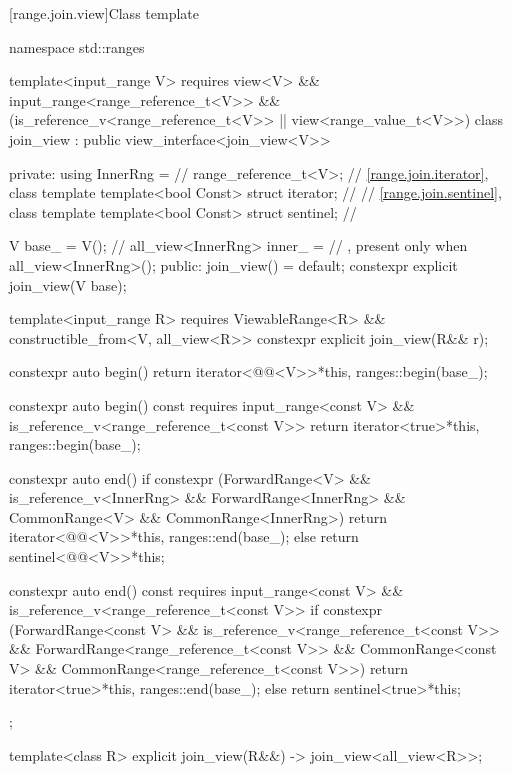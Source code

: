 [range.join.view]{Class template }

\begin{codeblock}
namespace std::ranges {
  template<input_range V>
    requires view<V> && input_range<range_reference_t<V>> &&
             (is_reference_v<range_reference_t<V>> ||
              view<range_value_t<V>>)
  class join_view : public view_interface<join_view<V>> {
  private:
    using InnerRng =                    // \expos
      range_reference_t<V>;
    // \ref{range.join.iterator}, class template 
    template<bool Const>
      struct iterator;                  // \expos
    // \ref{range.join.sentinel}, class template 
    template<bool Const>
      struct sentinel;                  // \expos

    V base_ = V();                      // \expos
    all_view<InnerRng> inner_ =         // \expos, present only when 
      all_view<InnerRng>();
  public:
    join_view() = default;
    constexpr explicit join_view(V base);

    template<input_range R>
      requires ViewableRange<R> && constructible_from<V, all_view<R>>
    constexpr explicit join_view(R&& r);

    constexpr auto begin() {
      return iterator<@@<V>>{*this, ranges::begin(base_)};
    }

    constexpr auto begin() const
    requires input_range<const V> &&
             is_reference_v<range_reference_t<const V>> {
      return iterator<true>{*this, ranges::begin(base_)};
    }

    constexpr auto end() {
      if constexpr (ForwardRange<V> &&
                    is_reference_v<InnerRng> && ForwardRange<InnerRng> &&
                    CommonRange<V> && CommonRange<InnerRng>)
        return iterator<@@<V>>{*this, ranges::end(base_)};
      else
        return sentinel<@@<V>>{*this};
    }

    constexpr auto end() const
    requires input_range<const V> &&
             is_reference_v<range_reference_t<const V>> {
      if constexpr (ForwardRange<const V> &&
                    is_reference_v<range_reference_t<const V>> &&
                    ForwardRange<range_reference_t<const V>> &&
                    CommonRange<const V> &&
                    CommonRange<range_reference_t<const V>>)
        return iterator<true>{*this, ranges::end(base_)};
      else
        return sentinel<true>{*this};
    }
  };

  template<class R>
    explicit join_view(R&&) -> join_view<all_view<R>>;
}
\end{codeblock}

